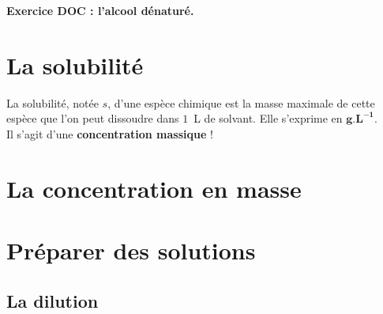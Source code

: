 \begin{Large}
\end{Large}\textbf{Exercice DOC : l'alcool dénaturé.}

\section{La solubilité}

\begin{tcolorbox}[colback=green!5!white,colframe=green!75!black,title=\textbf{Définition de la solubilité}]
La solubilité, notée $s$, d'une espèce chimique est la masse maximale de cette espèce que l'on peut dissoudre dans $1$~L de solvant. Elle s'exprime en $\mathbf{g.L^{-1}}$.\\
Il s'agit d'une \textbf{concentration massique} !
\end{tcolorbox}

\section{La concentration en masse}

\section{Préparer des solutions}

\subsection{La dilution}

